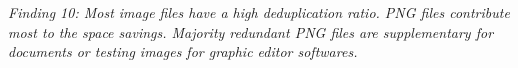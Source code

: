 \textit{Finding 10: Most image files have a high deduplication ratio. PNG files
contribute most to the space savings. Majority redundant PNG files are
supplementary for documents or testing images for graphic editor softwares.}
%
%
%
%
